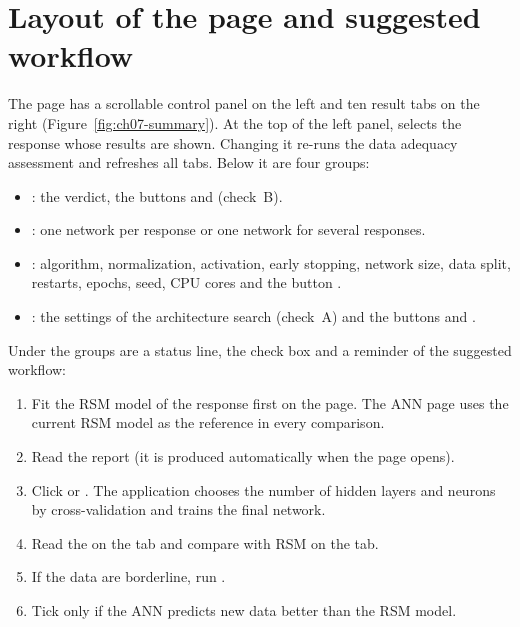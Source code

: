 \section{Layout of the page and suggested workflow}\label{sec:ch07-layout}

The page has a scrollable control panel on the left and ten result tabs on the right
(Figure~\ref{fig:ch07-summary}). At the top of the left panel,  selects the response whose
results are shown. Changing it re-runs the data adequacy assessment and refreshes all tabs. Below it are four
groups:
\begin{itemize}
  \item {}: the verdict, the buttons  and
     (check~B).
  \item {}: one network per response or one network for several responses.
  \item {}: algorithm, normalization, activation, early stopping, network size, data
    split, restarts, epochs, seed, CPU cores and the button .
  \item {}: the settings of the architecture search (check~A) and the
    buttons  and .
\end{itemize}
Under the groups are a status line, the check box  and a reminder of the suggested workflow:
\begin{enumerate}
  \item Fit the RSM model of the response first on the  page. The ANN page uses the current RSM
    model as the reference in every comparison.
  \item Read the  report (it is produced automatically when the page opens).
  \item Click  or . The application
    chooses the number of hidden layers and neurons by cross-validation and trains the final network.
  \item Read the  on the  tab and compare with RSM on the
     tab.
  \item If the data are borderline, run .
  \item Tick  only if the ANN
    predicts new data better than the RSM model.
\end{enumerate}


